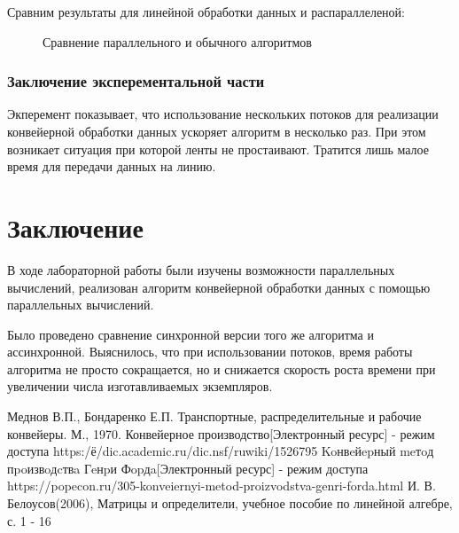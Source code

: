 \documentclass[12pt]{report}
\begin{document}
Сравним результаты для линейной обработки данных и распараллеленой:
\newpage

\begin{figure}
\caption{Сравнение параллельного и обычного алгоритмов} \label{plot:even}
\end{figure}
\par

\newpage
\subsection{Заключение эксперементальной части}
Экперемент показывает, что использование нескольких потоков для реализации конвейерной обработки данных ускоряет алгоритм в несколько раз. При этом возникает ситуация при которой ленты не простаивают. Тратится лишь малое время для передачи данных на линию.
\chapter*{Заключение}
В ходе лабораторной работы были изучены возможности параллельных вычислений, реализован алгоритм конвейерной обработки данных
с помощью параллельных вычислений.

Было проведено сравнение синхронной версии того же алгоритма и ассинхронной. Выяснилось, что при использовании потоков, время работы алгоритма не просто сокращается, но и снижается скорость роста времени при увеличении числа изготавливаемых экземпляров.

\begin{thebibliography}{3}
 Меднов В.П., Бондаренко Е.П. Транспортные, распределительные и рабочие конвейеры. М., 1970.
 Конвейерное производство[Электронный ресурс] - режим доступа https:/ё/dic.academic.ru/dic.nsf/ruwiki/1526795
 Koнвeйepный meтoд пpoизвoдcтвa Гeнpи Фopдa[Электронный ресурс] - режим доступа https://popecon.ru/305-konveiernyi-metod-proizvodstva-genri-forda.html
 И. В. Белоусов(2006), Матрицы и определители, учебное пособие по линейной алгебре, с. 1 - 16
\end{thebibliography}
\end{document}
